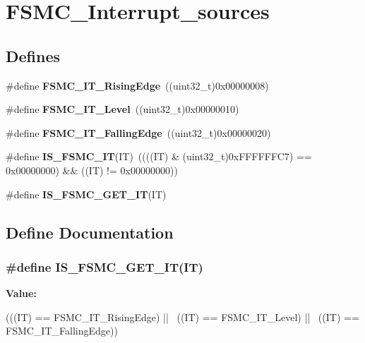 \hypertarget{group__FSMC__Interrupt__sources}{
\section{FSMC\_\-Interrupt\_\-sources}
\label{group__FSMC__Interrupt__sources}
}
\subsection*{Defines}
\begin{DoxyCompactItemize}
\item 
\hypertarget{group__FSMC__Interrupt__sources_gac483854bd6f90d8c7899a597a0c0ab1a}{
\#define {\bfseries FSMC\_\-IT\_\-RisingEdge}~((uint32\_\-t)0x00000008)}
\label{group__FSMC__Interrupt__sources_gac483854bd6f90d8c7899a597a0c0ab1a}

\item 
\hypertarget{group__FSMC__Interrupt__sources_ga59b5839854074008fb36fa86ec50a0c7}{
\#define {\bfseries FSMC\_\-IT\_\-Level}~((uint32\_\-t)0x00000010)}
\label{group__FSMC__Interrupt__sources_ga59b5839854074008fb36fa86ec50a0c7}

\item 
\hypertarget{group__FSMC__Interrupt__sources_ga8e4b9589c9981c900b5f2e84581a9693}{
\#define {\bfseries FSMC\_\-IT\_\-FallingEdge}~((uint32\_\-t)0x00000020)}
\label{group__FSMC__Interrupt__sources_ga8e4b9589c9981c900b5f2e84581a9693}

\item 
\hypertarget{group__FSMC__Interrupt__sources_ga40a38f097a75f27a700e626905fa9a38}{
\#define {\bfseries IS\_\-FSMC\_\-IT}(IT)~((((IT) \& (uint32\_\-t)0xFFFFFFC7) == 0x00000000) \&\& ((IT) != 0x00000000))}
\label{group__FSMC__Interrupt__sources_ga40a38f097a75f27a700e626905fa9a38}

\item 
\#define {\bfseries IS\_\-FSMC\_\-GET\_\-IT}(IT)
\end{DoxyCompactItemize}


\subsection{Define Documentation}
\hypertarget{group__FSMC__Interrupt__sources_gae2a57d0b15e025212489ec1421ff245d}{
\subsubsection[{IS\_\-FSMC\_\-GET\_\-IT}]{\setlength{\rightskip}{0pt plus 5cm}\#define IS\_\-FSMC\_\-GET\_\-IT(IT)}}
\label{group__FSMC__Interrupt__sources_gae2a57d0b15e025212489ec1421ff245d}
{\bfseries Value:}
\begin{DoxyCode}
(((IT) == FSMC_IT_RisingEdge) || \
                            ((IT) == FSMC_IT_Level) || \
                            ((IT) == FSMC_IT_FallingEdge))
\end{DoxyCode}
